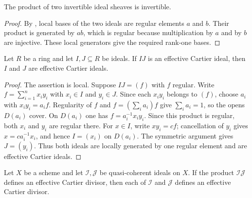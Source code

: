 \begin{lemma}
  \label{lemma:nagata-invertible-ideal-mul}
  \leanok

  The product of two invertible ideal sheaves is invertible.
\end{lemma}

\begin{proof}
  \leanok
  By , local bases of
  the two ideals are regular elements $a$ and $b$.  Their product is generated
  by $ab$, which is regular because multiplication by $a$ and by $b$ are
  injective.  These local generators give the required rank-one bases.
\end{proof}

\begin{lemma}
  \label{lemma:nagata-ideal-invertible-product-factor}
  \leanok

  Let $R$ be a ring and let $I,J\subseteq R$ be ideals.  If $IJ$
  is an effective Cartier ideal, then $I$ and $J$ are effective Cartier ideals.
\end{lemma}

\begin{proof}
  \leanok
  The assertion is local.  Suppose $IJ=(f)$ with $f$ regular.  Write
  $f=\sum_{i=1}^n x_i y_i$ with $x_i\in I$ and $y_i\in J$.  Since each
  $x_iy_i$ belongs to $(f)$, choose $a_i$ with $x_iy_i=a_if$.  Regularity of
  $f$ and $f=(\sum_i a_i)f$ give $\sum_i a_i=1$, so the opens $D(a_i)$
  cover.  On $D(a_i)$ one has
  $f=a_i^{-1}x_i y_i$.  Since this product is regular, both $x_i$ and $y_i$
  are regular there.  For $x\in I$, write $xy_i=cf$; cancellation of $y_i$
  gives $x=ca_i^{-1}x_i$, and hence $I=(x_i)$ on $D(a_i)$.  The symmetric
  argument gives $J=(y_i)$.  Thus both ideals are locally generated by one
  regular element and are effective Cartier ideals.
\end{proof}

\begin{lemma}
  \label{lemma:nagata-invertible-product-factor}
  \leanok

  Let $X$ be a scheme and let $\mathcal I,\mathcal J$ be quasi-coherent
  ideals on $X$.  If the product
  $\mathcal I\mathcal J$ defines an effective Cartier divisor, then each of
  $\mathcal I$ and $\mathcal J$ defines an effective Cartier divisor.
\end{lemma}

